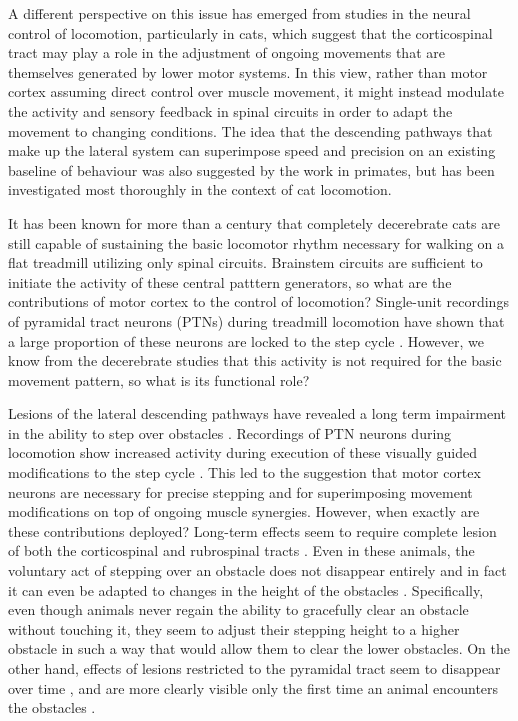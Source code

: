 A different perspective on this issue has emerged from studies in the neural control of locomotion, particularly in cats, which suggest that the corticospinal tract may play a role in the adjustment of ongoing movements that are themselves generated by lower motor systems. In this view, rather than motor cortex assuming direct control over muscle movement, it might instead modulate the activity and sensory feedback in spinal circuits in order to adapt the movement to changing conditions. The idea that the descending pathways that make up the lateral system can superimpose speed and precision on an existing baseline of behaviour was also suggested by the work in primates, but has been investigated most thoroughly in the context of cat locomotion.

It has been known for more than a century that completely decerebrate cats are still capable of sustaining the basic locomotor rhythm necessary for walking on a flat treadmill utilizing only spinal circuits. Brainstem circuits are sufficient to initiate the activity of these central patttern generators, so what are the contributions of motor cortex to the control of locomotion? Single-unit recordings of pyramidal tract neurons (PTNs) during treadmill locomotion have shown that a large proportion of these neurons are locked to the step cycle \cite{Armstrong1984a}. However, we know from the decerebrate studies that this activity is not required for the basic movement pattern, so what is its functional role?

Lesions of the lateral descending pathways have revealed a long term impairment in the ability to step over obstacles \cite{Drew2002}. Recordings of PTN neurons during locomotion show increased activity during execution of these visually guided modifications to the step cycle \cite{Drew1996}. This led to the suggestion that motor cortex neurons are necessary for precise stepping and for superimposing movement modifications on top of ongoing muscle synergies. However, when exactly are these contributions deployed? Long-term effects seem to require complete lesion of both the corticospinal and rubrospinal tracts \cite{Drew2002}. Even in these animals, the voluntary act of stepping over an obstacle does not disappear entirely and in fact it can even be adapted to changes in the height of the obstacles \cite{Drew2002}. Specifically, even though animals never regain the ability to gracefully clear an obstacle without touching it, they seem to adjust their stepping height to a higher obstacle in such a way that would allow them to clear the lower obstacles. On the other hand, effects of lesions restricted to the pyramidal tract seem to disappear over time \cite{Liddell1944}, and are more clearly visible only the first time an animal encounters the obstacles \cite{Liddell1944}.


